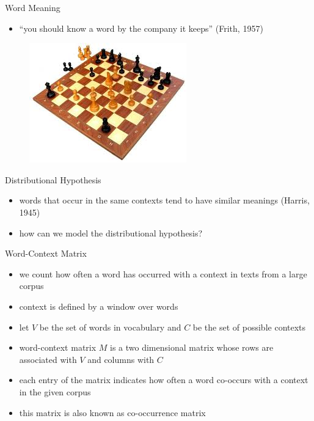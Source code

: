 \begin{frame}{Word Meaning}
\begin{itemize}
    \item<1-> ``you should know a word by the company it keeps'' (Frith, 1957)
\end{itemize}
\begin{figure}
    \centering
    \includegraphics{./figure/chess.jpg}
\end{figure}
\end{frame}
\begin{frame}{Distributional Hypothesis}
\begin{itemize}
    \item<1-> words that occur in the same contexts tend to have similar meanings (Harris, 1945)
    \item<2-> how can we model the distributional hypothesis?
\end{itemize}
\end{frame}
\begin{frame}{Word-Context Matrix}
\begin{itemize}
    \item<1-> we count how often a word has occurred with a context in texts from a large corpus
    \item<2-> context is defined by a window over words
    \item<3-> let $V$ be the set of words in vocabulary and $C$ be the set of possible contexts
    \item<4-> word-context matrix $M$ is a two dimensional matrix whose rows are associated with $V$ and columns with $C$
    \item<5-> each entry of the matrix indicates how often a word co-occurs with a context in the given corpus
    \item<6-> this matrix is also known as co-occurrence matrix
\end{itemize}
\end{frame}
